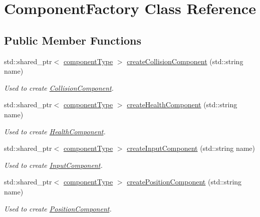\hypertarget{class_component_factory}{\section{Component\-Factory Class Reference}
\label{db/d28/class_component_factory}
}
\subsection*{Public Member Functions}
\begin{DoxyCompactItemize}
\item 
std\-::shared\-\_\-ptr$<$ \hyperlink{_abstract_component_8h_a2fb71c745bae7eefb130b6bd26fec141}{component\-Type} $>$ \hyperlink{class_component_factory_a535bb905fc8bebd51ea0ba422a9a60c2}{create\-Collision\-Component} (std\-::string name)
\begin{DoxyCompactList}\small\item\em Used to create \hyperlink{class_collision_component}{Collision\-Component}. \end{DoxyCompactList}\item 
std\-::shared\-\_\-ptr$<$ \hyperlink{_abstract_component_8h_a2fb71c745bae7eefb130b6bd26fec141}{component\-Type} $>$ \hyperlink{class_component_factory_aabec687e57b5ab4b1125f32508d38188}{create\-Health\-Component} (std\-::string name)
\begin{DoxyCompactList}\small\item\em Used to create \hyperlink{class_health_component}{Health\-Component}. \end{DoxyCompactList}\item 
std\-::shared\-\_\-ptr$<$ \hyperlink{_abstract_component_8h_a2fb71c745bae7eefb130b6bd26fec141}{component\-Type} $>$ \hyperlink{class_component_factory_aa48a8044f5c65738dcfbca91dd840c5c}{create\-Input\-Component} (std\-::string name)
\begin{DoxyCompactList}\small\item\em Used to create \hyperlink{class_input_component}{Input\-Component}. \end{DoxyCompactList}\item 
std\-::shared\-\_\-ptr$<$ \hyperlink{_abstract_component_8h_a2fb71c745bae7eefb130b6bd26fec141}{component\-Type} $>$ \hyperlink{class_component_factory_a4678e34498f26e608da37f8497e07ced}{create\-Position\-Component} (std\-::string name)
\begin{DoxyCompactList}\small\item\em Used to create \hyperlink{class_position_component}{Position\-Component}. \end{DoxyCompactList}\item 

\end{DoxyCompactItemize}
